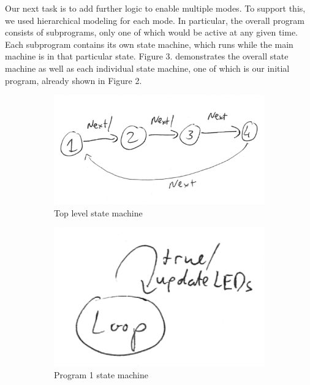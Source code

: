 \documentclass[10pt,titlepage]{article}
\begin{document}
  Our next task is to add further logic to enable multiple modes. To support this, we used hierarchical modeling for each mode. In particular, the overall program consists of subprograms, only one of which would be active at any given time. Each subprogram contains its own state machine, which runs while the main machine is in that particular state. Figure 3. demonstrates the overall state machine as well as each individual state machine, one of which is our initial program, already shown in Figure 2. \\
  \begin{figure}[p]
      \centering
      \begin{subfigure}[b]{0.7\textwidth}
      \includegraphics[width=\textwidth]{all.png}
      \caption{Top level state machine}
      \end{subfigure}
      \begin{subfigure}[b]{0.48\textwidth}
      \includegraphics[width=\textwidth]{1.png}
      \caption{Program 1 state machine}
      \end{subfigure}
      \begin{subfigure}[b]{0.48\textwidth}

\end{subfigure}
\end{figure}
\end{document}
